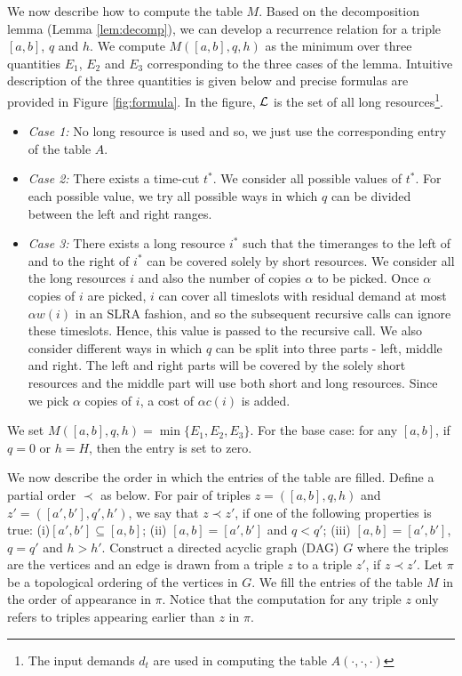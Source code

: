 \documentclass[11pt]{article}
\newcommand{\calL} {{\cal L}}
\begin{document}
We now describe how to compute the table $M$. 
Based on the decomposition lemma (Lemma \ref{lem:decomp}), we can develop a recurrence relation 
for a triple $[a,b]$, $q$ and $h$. 
We compute $M([a,b],q,h)$ as the minimum over three quantities $E_1$, $E_2$ and $E_3$ corresponding to the three cases
of the lemma. Intuitive description of the three quantities is given below and precise formulas are provided
in Figure \ref{fig:formula}. In the figure, $\calL$ is the set of all long resources\footnote{The input demands
$d_t$ are used in computing the table $A(\cdot,\cdot,\cdot)$}.
\begin{itemize}
\item 
{\it Case 1: } 
No long resource is used and so, we just use the 
corresponding entry of the table $A$. 
\item
{\it Case 2: } There exists a time-cut $t^*$. We consider all possible values
of $t^*$. For each possible value, we try all possible ways in which $q$ can be divided between the left and right ranges.
\item
{\it Case 3: }
There exists a long resource $i^*$ such that the timeranges to the left of and to the right of
$i^*$ can be covered solely by short resources.
We consider all the long resources $i$ and also the number of copies $\alpha$ to be picked.
Once $\alpha$ copies of $i$ are picked, $i$ can cover all timeslots with residual demand at most
$\alpha w(i)$ in an SLRA fashion, and so the subsequent recursive calls can ignore these timeslots.
Hence, this value is passed to the recursive call.
We also consider different ways in which $q$ can be split into three parts - left, middle and right.
The left and right parts will be covered by the solely short resources and the middle part will use both 
short and long resources.
Since we pick $\alpha$ copies of $i$, a cost of $\alpha c(i)$ is added.
\end{itemize}
We set $M([a,b],q,h)=\min\{E_1, E_2, E_3\}$. For the base case: for any $[a,b]$, if $q=0$ or $h = H$,
then the entry is set to zero.

We now describe the order in which the entries of the table are filled.
Define a partial order $\prec$ as below.
For pair of triples $z=([a,b],q,h)$ and $z'=([a',b'],q',h')$,
we say that $z\prec z'$, if one of the following properties is true:
(i)$[a',b']\subseteq [a,b]$; 
(ii) $[a,b]=[a',b']$ and $q<q'$; 
(iii) $[a,b]=[a',b']$, $q=q'$ and $h>h'$.
Construct a directed acyclic graph (DAG) $G$ where the triples
are the vertices and an  edge is drawn from a triple $z$ to a triple $z'$,
if $z\prec z'$. Let $\pi$ be a topological ordering of the vertices in $G$.
We fill the entries of the table $M$ in the order of appearance in $\pi$.
Notice that the computation for any triple $z$ only refers to triples appearing
earlier than $z$ in $\pi$.
\end{document}
